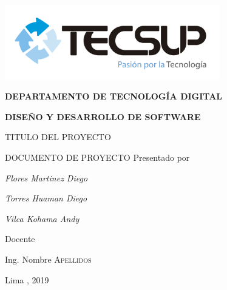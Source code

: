 \begin{titlepage}
	\centering
	\includegraphics[width=0.70\textwidth]{img/logo_tecsup_final}\par\vspace{1cm}
	\vspace{0.30cm}	
	{\scshape\large\bfseries DEPARTAMENTO DE TECNOLOG\'IA DIGITAL \par}
	\vspace{0.60cm}	
	{\scshape\large\bfseries DISEÑO Y DESARROLLO DE SOFTWARE  \par}
	\vspace{2.00cm}		
	{\large\large TITULO DEL PROYECTO \par}
	\vspace{0.60cm}
	{\scshape\large DOCUMENTO DE PROYECTO }
	\vspace{0.60cm}
	\vfill
	Presentado por \par
	{\large\itshape {Flores Martinez Diego}\par}
	{\large\itshape {Torres Huaman Diego}\par}
	{\large\itshape {Vilca Kohama Andy}\par}
	\vspace{0.30cm}
	\vfill
	Docente \par
	Ing. Nombre  \textsc{ Apellidos}
	
  \vspace{0.30cm}
	\vfill
        {\large Lima , 2019 \par}
\end{titlepage}

